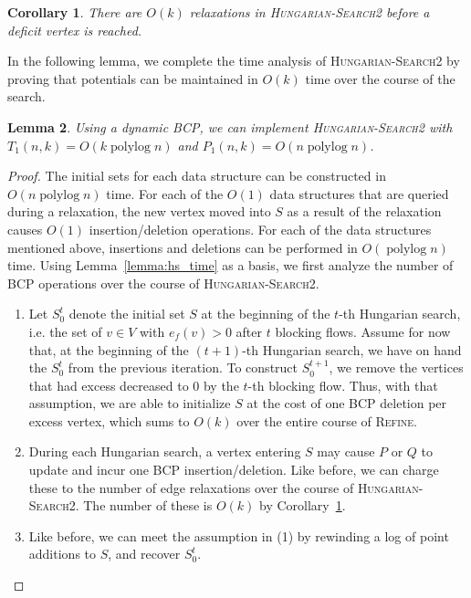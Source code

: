 \documentclass[11pt]{article}
\def\polylog{\mathop{\mathrm{polylog}}}
\theoremstyle{plain}
\newtheorem{lemma}{Lemma}[section]
\newtheorem{corollary}[lemma]{Corollary}
\numberwithin{figure}{section}
\begin{document}
\begin{corollary}
\label{corollary:goldberg_hs_length}
There are $O(k)$ relaxations in \textsc{Hungarian-Search2} before a deficit
vertex is reached.
\end{corollary}

In the following lemma, we complete the time analysis of
\textsc{Hungarian-Search2} by proving that potentials can be maintained in
$O(k)$ time over the course of the search.

\begin{lemma}
\label{lemma:goldberg_hs_time}
Using a dynamic BCP, we can implement \textsc{Hungarian-Search2} with
$T_1(n, k) = O(k\polylog n)$ and $P_1(n, k) = O(n\polylog n)$.
\end{lemma}

\begin{proof}
The initial sets for each data structure can be constructed in
$O(n\polylog n)$ time.
For each of the $O(1)$ data structures that are queried during a relaxation,
the new vertex moved into $S$ as a result of the relaxation causes $O(1)$
insertion/deletion operations.
For each of the data structures mentioned above, insertions and deletions
can be performed in $O(\polylog n)$ time.
Using Lemma~\ref{lemma:hs_time} as a basis, we first analyze the number of BCP
operations over the course of \textsc{Hungarian-Search2}.

\begin{enumerate}
\item Let $S^t_0$ denote the initial set $S$ at the beginning of the
	$t$-th Hungarian search, i.e. the set of $v \in V$ with
	$e_f(v) > 0$ after $t$ blocking flows.
	Assume for now that, at the beginning of the $(t+1)$-th
	Hungarian search, we have on hand the $S^t_0$ from the
	previous iteration.
	To construct $S^{t+1}_0$, we remove the vertices that had
	excess decreased to 0 by the $t$-th blocking flow.
	Thus, with that assumption, we are able to initialize $S$ at
	the cost of one BCP deletion per excess vertex, which sums to
	$O(k)$ over the entire course of \textsc{Refine}.
\item During each Hungarian search, a vertex entering $S$ may cause $P$
	or $Q$ to update and incur one BCP insertion/deletion.
	Like before, we can charge these to the number of edge
	relaxations over the course of \textsc{Hungarian-Search2}.
	The number of these is $O(k)$ by
	Corollary~\ref{corollary:goldberg_hs_length}.
\item Like before, we can meet the assumption in (1) by rewinding a log
	of point additions to $S$, and recover $S^t_0$.
\end{enumerate}


\end{proof}
\end{document}
